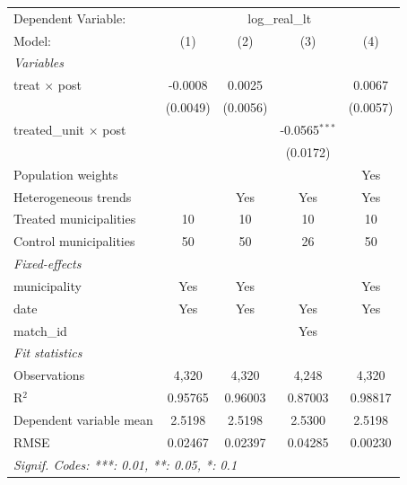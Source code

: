 
\begingroup
\centering
\begin{tabular}{lcccc}
   \tabularnewline \midrule \midrule
   Dependent Variable: & \multicolumn{4}{c}{log\_real\_lt}\\
   Model:                        & (1)      & (2)      & (3)             & (4)\\  
   \midrule
   \emph{Variables}\\
   treat $\times$ post           & -0.0008  & 0.0025   &                 & 0.0067\\   
                                 & (0.0049) & (0.0056) &                 & (0.0057)\\   
   treated\_unit $\times$ post   &          &          & -0.0565$^{***}$ &   \\   
                                 &          &          & (0.0172)        &   \\   
   Population weights            &          &          &                 & Yes\\  
   Heterogeneous trends          &          & Yes      & Yes             & Yes\\  
   Treated municipalities        & 10       & 10       & 10              & 10\\  
   Control municipalities        & 50       & 50       & 26              & 50\\  
   \midrule
   \emph{Fixed-effects}\\
   municipality                  & Yes      & Yes      &                 & Yes\\  
   date                          & Yes      & Yes      & Yes             & Yes\\  
   match\_id                     &          &          & Yes             & \\  
   \midrule
   \emph{Fit statistics}\\
   Observations                  & 4,320    & 4,320    & 4,248           & 4,320\\  
   R$^2$                         & 0.95765  & 0.96003  & 0.87003         & 0.98817\\  
   Dependent variable mean       & 2.5198   & 2.5198   & 2.5300          & 2.5198\\  
   RMSE                          & 0.02467  & 0.02397  & 0.04285         & 0.00230\\  
   \midrule \midrule
   \multicolumn{5}{l}{\emph{Signif. Codes: ***: 0.01, **: 0.05, *: 0.1}}\\
\end{tabular}
\par\endgroup


